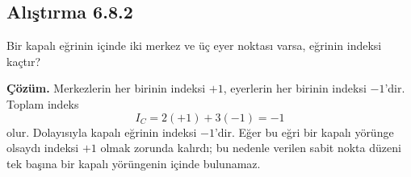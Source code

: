 \subsection*{Alıştırma 6.8.2}

\begin{justify}
Bir kapalı eğrinin içinde iki merkez ve üç eyer noktası varsa, eğrinin indeksi kaçtır?

\textbf{Çözüm.} Merkezlerin her birinin indeksi $+1$, eyerlerin her birinin indeksi $-1$'dir. Toplam indeks
\begin{equation}
I_C=2(+1)+3(-1)=-1
\end{equation}
olur. Dolayısıyla kapalı eğrinin indeksi $-1$'dir. Eğer bu eğri bir kapalı yörünge olsaydı indeksi $+1$ olmak zorunda kalırdı; bu nedenle verilen sabit nokta düzeni tek başına bir kapalı yörüngenin içinde bulunamaz.
\end{justify}

\newpage
